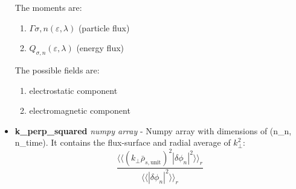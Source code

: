 \documentclass{article}
\begin{document}
\begin{itemize}
The moments are:
\begin{enumerate}
\item $\Gamma{\sigma,n}(\varepsilon,\lambda)$ (particle flux)
\item $Q_{\sigma,n}(\varepsilon,\lambda)$ (energy flux)
\end{enumerate}
The possible fields are:
\begin{enumerate}
\item electrostatic component
\item electromagnetic component
\end{enumerate}
\item \textbf{k\_perp\_squared}\emph{ numpy array} - Numpy array with dimensions of (n\_n, n\_time).  It contains the flux-surface and radial average of $k^2_\perp$:
$$\frac{\langle\langle(k_\perp\bar{\rho}_{s,\mathrm{unit}})^2|\delta\phi_n|^2\rangle\rangle_r}{\langle\langle|\delta\phi_n|^2\rangle\rangle_r}$$
\end{itemize}
\end{document}
